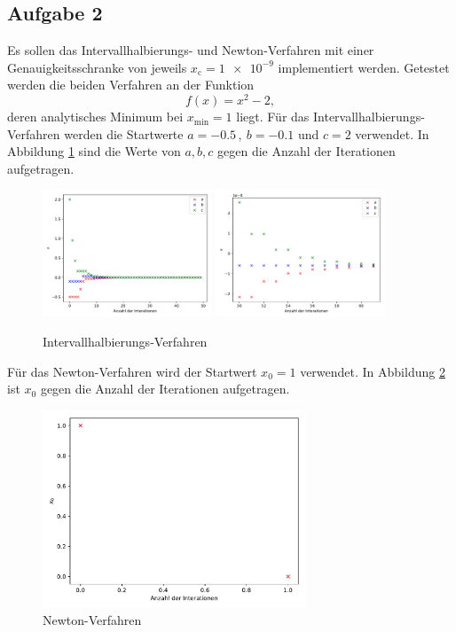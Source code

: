 \subsection*{Aufgabe 2}

Es sollen das Intervallhalbierungs- und Newton-Verfahren mit einer Genauigkeitsschranke von jeweils \(x_\text{c} = \num{1e-9}\) implementiert werden. Getestet werden die beiden Verfahren an der Funktion
\begin{equation}
  f(x) = x^2-2, \label{eqn:f}
\end{equation}
deren analytisches Minimum bei \(x_\text{min} = 1\) liegt.
Für das Intervallhalbierungs-Verfahren werden die Startwerte \(a = \num{-0,5} \,, \: b = \num{-0,1}\) und \(c = 2\) verwendet.
In Abbildung \ref{fig:intervall} sind die Werte von \(a,b,c\) gegen die Anzahl der Iterationen aufgetragen.
\begin{figure}
  \centering
  \includegraphics[width=0.45\textwidth]{A2/build/intervallhalbierung.pdf}
  \includegraphics[width=0.45\textwidth]{A2/build/intervallhalbierung2.pdf}
  \caption{Intervallhalbierungs-Verfahren}
  \label{fig:intervall}
\end{figure}
Für das Newton-Verfahren wird der Startwert \(x_0 = 1\) verwendet. In Abbildung \ref{fig:newton} ist \(x_0\) gegen die Anzahl der Iterationen aufgetragen.
\begin{figure}
  \centering
  \includegraphics[width=0.7\textwidth]{A2/build/newton.pdf}
  \caption{Newton-Verfahren}
  \label{fig:newton}
\end{figure}
